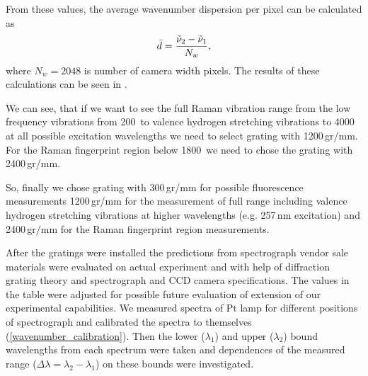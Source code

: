 From these values, the average wavenumber dispersion per pixel can be
calculated as
\begin{equation}
	\bar{d} = \frac{\tilde{\nu}_2 - \tilde{\nu}_1}{N_w},
	\label{\eqnlabel{spectrograph_selection:dispersion_est}}
\end{equation}
where $N_w = 2048$ is number of camera width pixels. The results of these
calculations can be seen in
.

\begin{table}
	\centering
	
	\caption{Spectrograph dispersion estimation. Gratings are denoted by number
		of grooves per mm, $\tilde{\nu}_1$ and $\tilde{\nu}_2$ are lowest and
		highest detected frequencies in \icm calculated according to
		\cref{%
			\eqnlabel{spectrograph_selection:spectral_range_max_est},%
			\eqnlabel{spectrograph_selection:spectral_range_min_est}%
		},
		respectively. The $\bar{d}$ denotes average dispersion in \icm/px
		calculated from
		.}
	\label{\tablabel{spectrograph_selection:dispersion_est}}
\end{table}

We can see, that if we want to see the full Raman vibration range from the
low frequency vibrations from 200\,\icm{} to valence hydrogen stretching
vibrations to 4000\,\icm{} at all possible excitation wavelengths we need to
select grating with 1200\,gr/mm. For the Raman fingerprint region below
1800\,\icm{} we need to chose the grating with 2400\,gr/mm.

So, finally we chose grating with 300\,gr/mm for possible fluorescence
measurements 1200\,gr/mm for the measurement of full range including valence
hydrogen stretching vibrations at higher wavelengths (e.g. 257\,nm excitation)
and 2400\,gr/mm for the Raman fingerprint region measurements.

After the gratings were installed the predictions from spectrograph vendor
sale materials were evaluated on actual experiment and with help of
diffraction grating theory and spectrograph and CCD camera specifications.
The values in the table were adjusted for possible future evaluation of
extension of our experimental capabilities. We measured spectra of Pt lamp for
different positions of spectrograph and calibrated the spectra to themselves
(\cref{wavenumber_calibration}).
Then the lower ($\lambda_1$) and upper ($\lambda_2$) bound wavelengths from
each spectrum were taken and dependences of the measured range
($\Delta\lambda = \lambda_2 - \lambda_1$)
on these bounds were investigated.

